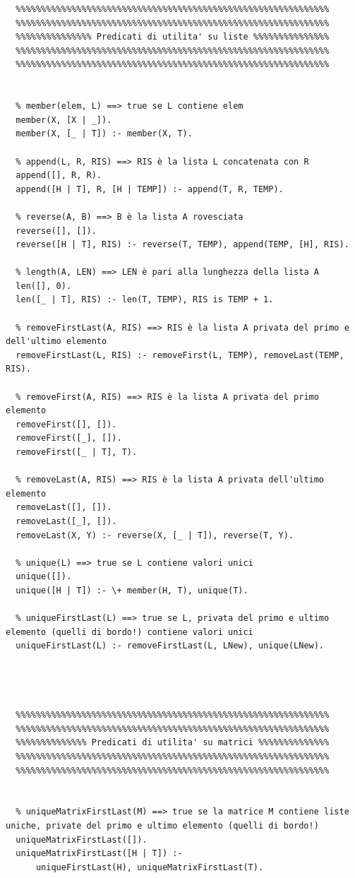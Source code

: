 \documentclass{article}
\begin{document}
\begin{lstlisting}
  %%%%%%%%%%%%%%%%%%%%%%%%%%%%%%%%%%%%%%%%%%%%%%%%%%%%%%%%%%%%%%
  %%%%%%%%%%%%%%%%%%%%%%%%%%%%%%%%%%%%%%%%%%%%%%%%%%%%%%%%%%%%%%
  %%%%%%%%%%%%%%% Predicati di utilita' su liste %%%%%%%%%%%%%%%
  %%%%%%%%%%%%%%%%%%%%%%%%%%%%%%%%%%%%%%%%%%%%%%%%%%%%%%%%%%%%%%
  %%%%%%%%%%%%%%%%%%%%%%%%%%%%%%%%%%%%%%%%%%%%%%%%%%%%%%%%%%%%%%
  
  
  % member(elem, L) ==> true se L contiene elem
  member(X, [X | _]).
  member(X, [_ | T]) :- member(X, T).
  
  % append(L, R, RIS) ==> RIS è la lista L concatenata con R
  append([], R, R).
  append([H | T], R, [H | TEMP]) :- append(T, R, TEMP).
  
  % reverse(A, B) ==> B è la lista A rovesciata
  reverse([], []).
  reverse([H | T], RIS) :- reverse(T, TEMP), append(TEMP, [H], RIS).
  
  % length(A, LEN) ==> LEN è pari alla lunghezza della lista A
  len([], 0).
  len([_ | T], RIS) :- len(T, TEMP), RIS is TEMP + 1.
  
  % removeFirstLast(A, RIS) ==> RIS è la lista A privata del primo e dell'ultimo elemento
  removeFirstLast(L, RIS) :- removeFirst(L, TEMP), removeLast(TEMP, RIS).
  
  % removeFirst(A, RIS) ==> RIS è la lista A privata del primo elemento
  removeFirst([], []).
  removeFirst([_], []).
  removeFirst([_ | T], T). 
  
  % removeLast(A, RIS) ==> RIS è la lista A privata dell'ultimo elemento
  removeLast([], []).
  removeLast([_], []).
  removeLast(X, Y) :- reverse(X, [_ | T]), reverse(T, Y).
  
  % unique(L) ==> true se L contiene valori unici
  unique([]).
  unique([H | T]) :- \+ member(H, T), unique(T).
  
  % uniqueFirstLast(L) ==> true se L, privata del primo e ultimo elemento (quelli di bordo!) contiene valori unici
  uniqueFirstLast(L) :- removeFirstLast(L, LNew), unique(LNew).
  
  


  %%%%%%%%%%%%%%%%%%%%%%%%%%%%%%%%%%%%%%%%%%%%%%%%%%%%%%%%%%%%%%
  %%%%%%%%%%%%%%%%%%%%%%%%%%%%%%%%%%%%%%%%%%%%%%%%%%%%%%%%%%%%%%
  %%%%%%%%%%%%%% Predicati di utilita' su matrici %%%%%%%%%%%%%%
  %%%%%%%%%%%%%%%%%%%%%%%%%%%%%%%%%%%%%%%%%%%%%%%%%%%%%%%%%%%%%%
  %%%%%%%%%%%%%%%%%%%%%%%%%%%%%%%%%%%%%%%%%%%%%%%%%%%%%%%%%%%%%%
  
  
  % uniqueMatrixFirstLast(M) ==> true se la matrice M contiene liste uniche, private del primo e ultimo elemento (quelli di bordo!)
  uniqueMatrixFirstLast([]).
  uniqueMatrixFirstLast([H | T]) :- 
      uniqueFirstLast(H), uniqueMatrixFirstLast(T).
  

\end{lstlisting}
\end{document}
